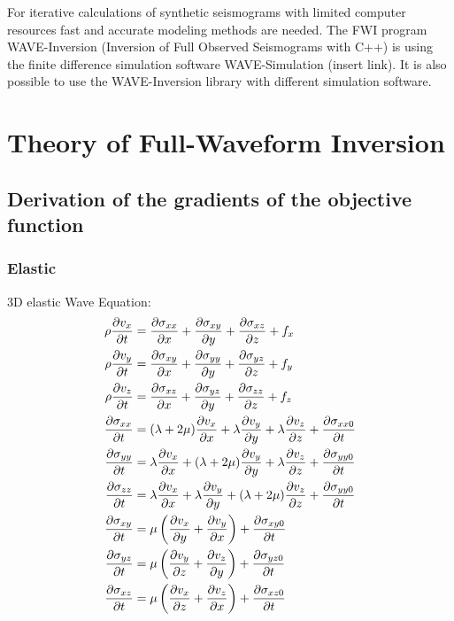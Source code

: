 \documentclass[pdftex,a4paper,parskip,listof=totoc,bibliography=totoc,onehalfspacing,12pt]{scrreprt}
\begin{document}
For iterative calculations of synthetic seismograms with limited computer resources fast and accurate modeling methods are needed. The FWI program WAVE-Inversion (Inversion of Full Observed Seismograms with C++) is using the finite difference simulation software WAVE-Simulation (insert link). It is also possible to use the WAVE-Inversion library with different simulation software.

\cleardoublepage
\part{Theory of Full-Waveform Inversion}
\chapter{Derivation of the gradients of the objective function}

\section{Elastic}
\label{kap:el}

3D elastic Wave Equation:
\begin{align}
\rho\pdv{v_x}{t}&=\pdv{\sigma_{xx}}{x}+\pdv{\sigma_{xy}}{y} + \pdv{\sigma_{xz}}{z}+ f_x\\
\rho\pdv{v_y}{t}&=\pdv{\sigma_{xy}}{x}+\pdv{\sigma_{yy}}{y} + \pdv{\sigma_{yz}}{z} + f_y\\
\rho\pdv{v_z}{t}&=\pdv{\sigma_{xz}}{x}+\pdv{\sigma_{yz}}{y} + \pdv{\sigma_{zz}}{z} + f_z\\
\pdv{\sigma_{xx}}{t} &= (\lambda+2\mu) \pdv{v_x}{x} + \lambda \pdv{v_y}{y} + \lambda \pdv{v_z}{z} + \pdv{\sigma_{xx0}}{t}\\
\pdv{\sigma_{yy}}{t} &= \lambda \pdv{v_x}{x} + (\lambda+2\mu) \pdv{v_y}{y} + \lambda \pdv{v_z}{z} + \pdv{\sigma_{yy0}}{t}\\
\pdv{\sigma_{zz}}{t} &= \lambda \pdv{v_x}{x} +  \lambda \pdv{v_y}{y} + (\lambda+2\mu) \pdv{v_z}{z} + \pdv{\sigma_{yy0}}{t}\\
\pdv{\sigma_{xy}}{t} &= \mu \left(\pdv{v_x}{y} +\pdv{v_y}{x}\right) + \pdv{\sigma_{xy0}}{t}\\
\pdv{\sigma_{yz}}{t} &= \mu \left(\pdv{v_y}{z} +\pdv{v_z}{y}\right) + \pdv{\sigma_{yz0}}{t}\\
\pdv{\sigma_{xz}}{t} &= \mu \left(\pdv{v_x}{z} +\pdv{v_z}{x}\right) + \pdv{\sigma_{xz0}}{t}
\end{align}
\end{document}
